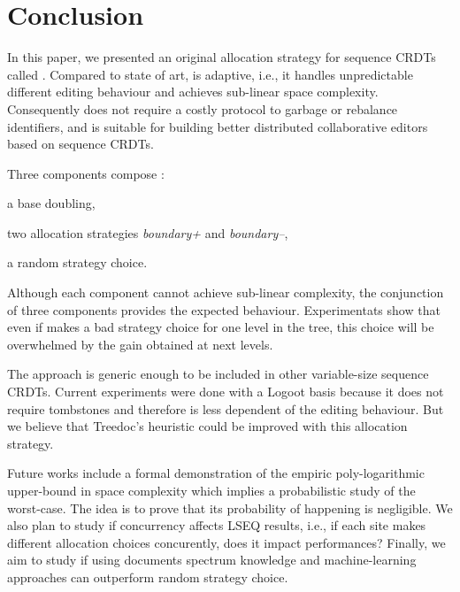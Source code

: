\section{Conclusion}

In this paper, we presented an original allocation strategy for sequence CRDTs
called \NAME{}. Compared to state of art, \NAME{} is adaptive, i.e., it handles
unpredictable different editing behaviour and achieves sub-linear space
complexity. Consequently \NAME{} does not require a costly protocol to garbage
or rebalance identifiers, and is suitable for building better distributed
collaborative editors based on sequence CRDTs.

Three components compose \NAME{}:
\begin{inparaenum}[(1)]
  \item a base doubling,
  \item two allocation strategies \emph{boundary+} and \emph{boundary--},
  \item a random strategy choice.
\end{inparaenum}

Although each component cannot achieve sub-linear complexity, the conjunction
of three components provides the expected behaviour. Experimentats show that
even if \NAME{} makes a bad strategy choice for one level in the tree, this
choice will be overwhelmed by the gain obtained at next levels.


The \NAME{} approach is generic enough to be included in other variable-size
sequence CRDTs. Current experiments were done with a Logoot basis because it
does not require tombstones and therefore is less dependent of the editing
behaviour. But we believe that Treedoc's heuristic could be improved with this
allocation strategy.

Future works include a formal demonstration of the empiric poly-logarithmic
upper-bound in space complexity which implies a probabilistic study of the
worst-case. The idea is to prove that its probability of happening is
negligible. We also plan to study if concurrency affects LSEQ results, i.e., if
each site makes different allocation choices concurently, does it impact
\NAME{} performances? Finally, we aim to study if using documents spectrum
knowledge and machine-learning approaches can outperform random strategy
choice.
